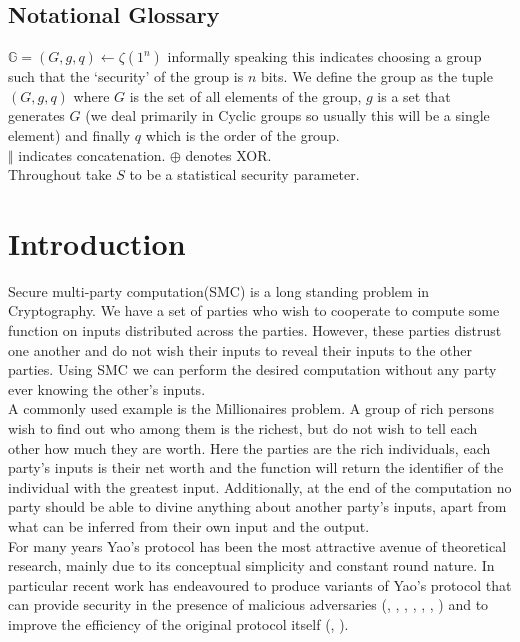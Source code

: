 \documentclass[ %
                    author={Nicholas Tutte},
                supervisor={Prof. Nigel Smart},
                    degree={MEng},
                     title={Secure Two Party Computation},
                  subtitle={A practical comparison of recent protocols},
                      type={Research - GG1K},
                      year={2015} ]{dissertation}
\begin{document}
		\section*{Notational Glossary}
			$\mathbb{G} = (G, g, q) \leftarrow \zeta(1^n)$ informally speaking this indicates choosing a group such that the `security' of the group is $n$ bits. We define the group as the tuple $(G, g, q)$ where $G$ is the set of all elements of the group, $g$ is a set that generates $G$ (we deal primarily in Cyclic groups so usually this will be a single element) and finally $q$ which is the order of the group.\\

			$\Vert$ indicates concatenation. $\oplus$ denotes XOR.\\

			Throughout take $S$ to be a statistical security parameter.\\

	\tableofcontents

	\chapter{Introduction}
		\setcounter{page}{1}

		Secure multi-party computation(SMC) is a long standing problem in Cryptography. We have a set of parties who wish to cooperate to compute some function on inputs distributed across the parties. However, these parties distrust one another and do not wish their inputs to reveal their inputs to the other parties. Using SMC we can perform the desired computation without any party ever knowing the other's inputs.\\

		A commonly used example is the Millionaires problem. A group of rich persons wish to find out who among them is the richest, but do not wish to tell each other how much they are worth. Here the parties are the rich individuals, each party's inputs is their net worth and the function will return the identifier of the individual with the greatest input. Additionally, at the end of the computation no party should be able to divine anything about another party's inputs, apart from what can be inferred from their own input and the output.\\

		For many years Yao's protocol \cite{YaoOriginal} has been the most attractive avenue of theoretical research, mainly due to its conceptual simplicity and constant round nature. In particular recent work has endeavoured to produce variants of Yao's protocol that can provide security in the presence of malicious adversaries (\cite{LindellAndPinkas2007}, \cite{LindellAndPinkas2011}, \cite{Lindell_CnC_2013}, \cite{Katz_Symm_CnC_2013}, \cite{OnCommittedInputs}, \cite{LEGO_Paper}, \cite{MiniLEGO}) and to improve the efficiency of the original protocol itself (\cite{SMC_Is_Practical}, \cite{FreeXOR}).\\
\end{document}
